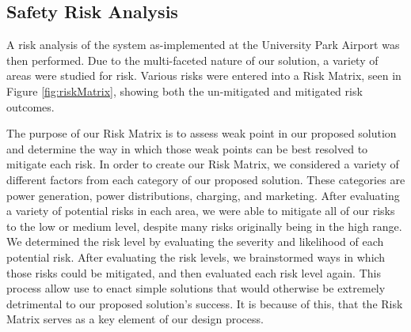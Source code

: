\documentclass[../main.tex]{subfiles}
\begin{document}
\subsection{Safety Risk Analysis} %
A risk analysis of the system as-implemented at the University Park Airport was then performed. Due to the multi-faceted nature of our solution, a variety of areas were studied for risk. Various risks were entered into a Risk Matrix, seen in Figure \ref{fig:riskMatrix}, showing both the un-mitigated and mitigated risk outcomes.\par
\begin{figure}[ht]
\end{figure}
\FloatBarrier
The purpose of our Risk Matrix is to assess weak point in our proposed solution and determine the way in which those weak points can be best resolved to mitigate each risk. In order to create our Risk Matrix, we considered a variety of different factors from each category of our proposed solution. These categories are power generation, power distributions, charging, and marketing. After evaluating a variety of potential risks in each area, we were able to mitigate all of our risks to the low or medium level, despite many risks originally being in the high range. We determined the risk level by evaluating the severity and likelihood of each potential risk. After evaluating the risk levels, we brainstormed ways in which those risks could be mitigated, and then evaluated each risk level again. This process allow use to enact simple solutions that would otherwise be extremely detrimental to our proposed solution's success. It is because of this, that the Risk Matrix serves as a key element of our design process. 

\newpage
\end{document}
